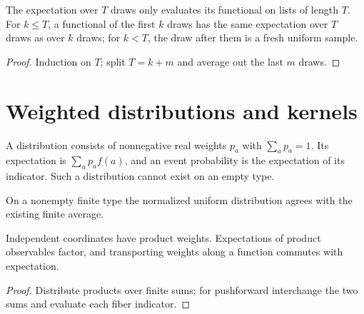 \begin{lemma}\label{lem:expList-prefix}
\leanok{}
The expectation over $T$ draws only evaluates its functional on lists of length $T$. For
$k\le T$, a functional of the first $k$ draws has the same expectation over $T$ draws as over
$k$ draws; for $k<T$, the draw after them is a fresh uniform sample.
\end{lemma}
\begin{proof}\leanok
Induction on $T$; split $T=k+m$ and average out the last $m$ draws.
\end{proof}

\section{Weighted distributions and kernels}
\begin{definition}\label{def:distribution}
\leanok
A distribution consists of nonnegative real weights $p_a$ with $\sum_a p_a=1$.
Its expectation is $\sum_a p_a f(a)$, and an event probability is the expectation
of its indicator. Such a distribution cannot exist on an empty type.
\end{definition}
\begin{lemma}\label{lem:uniform-agreement}
\leanok{}
On a nonempty finite type the normalized uniform distribution agrees with the
existing finite average.
\end{lemma}
\begin{lemma}\label{lem:weighted-product}
\leanok{}
Independent coordinates have product weights. Expectations of product
observables factor, and transporting weights along a function commutes with expectation.
\end{lemma}
\begin{proof}\leanok
Distribute products over finite sums; for pushforward interchange the two sums
and evaluate each fiber indicator.
\end{proof}
